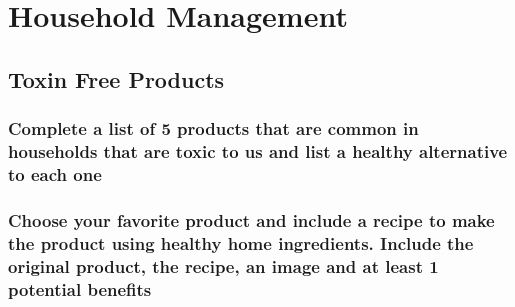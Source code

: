 \documentclass[11pt]{article}
\begin{document}
\section*{Household Management}
\label{sec:orgf33f1c3}
\subsection*{Toxin Free Products}
\label{sec:org7c33eef}
\subsubsection*{Complete a list of 5 products that are common in households that are toxic to us and list a healthy alternative to each one}
\label{sec:orgc7f8f6e}
\subsubsection*{Choose your favorite product and include a recipe to make the product using healthy home ingredients. Include the original product, the recipe, an image and at least 1 potential benefits}
\label{sec:org208ead0}
\end{document}

